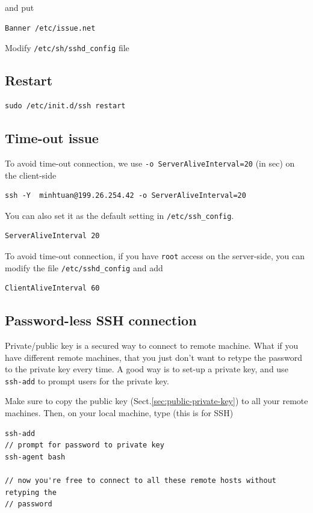 and put
\begin{verbatim}
Banner /etc/issue.net 
\end{verbatim}
Modify \verb!/etc/sh/sshd_config! file


\subsection{Restart}

\begin{verbatim}
sudo /etc/init.d/ssh restart
\end{verbatim}


\subsection{Time-out issue}

To avoid time-out connection, we use \verb!-o ServerAliveInterval=20! (in sec)
on the client-side
\begin{verbatim}
ssh -Y  minhtuan@199.26.254.42 -o ServerAliveInterval=20
\end{verbatim}
You can also set it as the default setting in \verb!/etc/ssh_config!.
\begin{verbatim}
ServerAliveInterval 20
\end{verbatim}

To avoid time-out connection, if you have \verb!root! access on the server-side,
you can modify the file \verb!/etc/sshd_config! and add
\begin{verbatim}
ClientAliveInterval 60
\end{verbatim}

\subsection{Password-less SSH connection}
\label{sec:passwordless-ssh}

Private/public key is a secured way to connect to remote machine. What if you
have different remote machines, that you just don't want to retype the password
to the private key every time. A good way is to set-up a private
key, and use \verb!ssh-add! to prompt users for the private key. 

Make sure to copy the public key (Sect.\ref{sec:public-private-key}) to all
your remote machines. Then, on your local machine, type (this is for SSH)
\begin{verbatim}
ssh-add
// prompt for password to private key
ssh-agent bash

// now you're free to connect to all these remote hosts without retyping the
// password
\end{verbatim}

